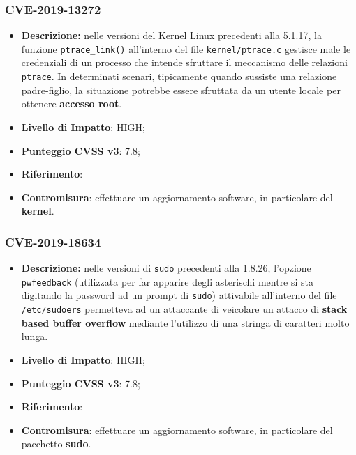 \documentclass[a4paper, 12pt, oneside]{article}
\begin{document}
\subsubsection{CVE-2019-13272}
\begin{itemize}
    \item \textbf{Descrizione:} nelle versioni del Kernel Linux precedenti alla 5.1.17, la funzione \texttt{ptrace\_link()} all'interno del file \texttt{kernel/ptrace.c} gestisce male le credenziali di un processo che intende sfruttare il meccanismo delle relazioni \texttt{ptrace}. In determinati scenari, tipicamente quando sussiste una relazione padre-figlio, la situazione potrebbe essere sfruttata da un utente locale per ottenere \textbf{accesso root}.
    \item \textbf{Livello di Impatto}: HIGH;
    \item \textbf{Punteggio CVSS v3}: 7.8;
    \item \textbf{Riferimento}: \cite{13272}
    \item \textbf{Contromisura}: effettuare un aggiornamento software, in particolare del \textbf{kernel}.
\end{itemize}

\subsubsection{CVE-2019-18634}
\begin{itemize}
    \item \textbf{Descrizione:} nelle versioni di \texttt{sudo} precedenti alla 1.8.26, l'opzione \texttt{pwfeedback} (utilizzata per far apparire degli asterischi mentre si sta digitando la password ad un prompt di \texttt{sudo}) attivabile all'interno del file \texttt{/etc/sudoers} permetteva ad un attaccante di veicolare un attacco di \textbf{stack based buffer overflow} mediante l'utilizzo di una stringa di caratteri molto lunga.
    \item \textbf{Livello di Impatto}: HIGH;
    \item \textbf{Punteggio CVSS v3}: 7.8;
    \item \textbf{Riferimento}: \cite{18634}
    \item \textbf{Contromisura}: effettuare un aggiornamento software, in particolare del pacchetto \textbf{sudo}.
\end{itemize}
\end{document}
